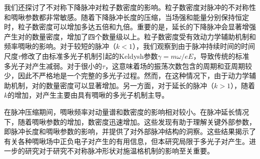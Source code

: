 我们还探讨了不对称下降脉冲对粒子数密度的影响。粒子数密度对脉冲的不对称性和啁啾参数都非常敏感。随着下降脉冲长度的压缩，当场强和能量分别保持恒定时，粒子数密度可以增加多达五倍和九倍。重要的是，延长的下降脉冲会显著增强产生对的数量密度，增加了四个数量级以上。粒子数密度受有效动力学辅助机制和频率啁啾的影响。对于较短的脉冲（$k<1$），我们观察到由于脉冲持续时间的时间尺度$\tau$修改了由标准多光子机制引起的Keldysh参数$\gamma = m\omega /eE$，导致传统的标准多光子对产生减弱。对于很小的$\tau$，这意味着场的振荡次数包含的周期和亚周期较少，因此不严格地是一个完整的多光子过程。然而，在这种情况下，由于动力学辅助机制，对的数量密度可以显著增加。另一方面，对于延长的脉冲（$k>1$），随着$k$的增加，对产生主要由具有啁啾的多光子机制主导。

在脉冲压缩期间，啁啾频率对动量谱和数密度的影响相对较小。在脉冲延长情况下，随着啁啾参数的增加，数密度迅速增加。这些发现有助于理解关键外部参数，即脉冲长度和啁啾参数的影响，并提供了对外部脉冲结构的洞察。这些结果揭示了有关各种啁啾场中正负电子对产生的有用信息，但本研究局限于多光子对产生。进一步的研究对于研究不对称脉冲形状对施温格机制的影响至关重要。
